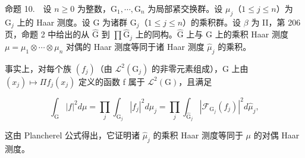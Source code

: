 命题 10.　设 \(n \geqslant 0\) 为整数，\(\mathrm{G}_{1}, \cdots, \mathrm{G}_{n}\) 为局部紧交换群。设 \(\mu_{j}\)（\(1 \leqslant j \leqslant n\)）为 \(\mathrm{G}_{j}\) 上的 Haar 测度。设 G 为诸群 \(\mathrm{G}_{j}\)（\(1 \leqslant j \leqslant n\)）的乘积群。设 \(\beta\) 为 II，第 206 页，命题 2 中给出的从 \(\widehat{\mathrm{G}}\) 到 \(\prod \widehat{\mathrm{G}}_{j}\) 上的同构。\(\widehat{\mathrm{G}}\) 上与 G 上的乘积 Haar 测度 \(\mu = \mu_{1} \otimes \cdots \otimes \mu_{n}\) 对偶的 Haar 测度等同于诸 Haar 测度 \(\widehat{\mu}_{j}\) 的乘积。

事实上，对每个族 \((f_{j})\)（由 \(\mathcal{L}^{2}(\mathrm{G}_{j})\) 的非零元素组成），G 上由 \((x_{j})\mapsto\Pi f_{j}(x_{j})\) 定义的函数 f 属于 \(\mathcal{L}^{2}(\mathrm{G})\)，且满足

\[
\int_ {\mathrm{G}} | f | ^ {2} d \mu = \prod_ {j} \int_ {\mathrm{G} _ {j}} | f _ {j} | ^ {2} d \mu_ {j} = \prod_ {j} \int_ {\widehat {\mathrm{G}} _ {j}} | \mathcal {F} _ {\mathrm{G} _ {j}} (f _ {j}) | ^ {2} d \widehat {\mu} _ {j},
\]

这由 Plancherel 公式得出，它证明诸 \(\widehat{\mu}_{j}\) 的乘积 Haar 测度等同于 \(\mu\) 的对偶 Haar 测度。

